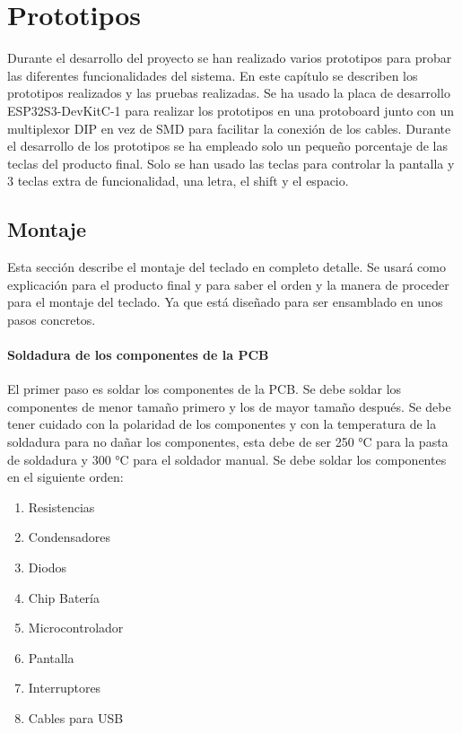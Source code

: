 \chapter{Prototipos}

Durante el desarrollo del proyecto se han realizado varios prototipos para probar las diferentes funcionalidades del sistema. En este capítulo se describen los prototipos realizados y las pruebas realizadas. Se ha usado la placa de desarrollo ESP32S3-DevKitC-1 para realizar los prototipos en una protoboard junto con un multiplexor DIP en vez de SMD para facilitar la conexión de los cables. Durante el desarrollo de los prototipos se ha empleado solo un pequeño porcentaje de las teclas del producto final. Solo se han usado las teclas para controlar la pantalla y 3 teclas extra de funcionalidad, una letra, el shift y el espacio.

\section{Montaje}
Esta sección describe el montaje del teclado en completo detalle. Se usará como explicación para el producto final y para saber el orden y la manera de proceder para el montaje del teclado. Ya que está diseñado para ser ensamblado en unos pasos concretos.

\subsubsection{Soldadura de los componentes de la PCB}
El primer paso es soldar los componentes de la PCB. Se debe soldar los componentes de menor tamaño primero y los de mayor tamaño después. Se debe tener cuidado con la polaridad de los componentes y con la temperatura de la soldadura para no dañar los componentes, esta debe de ser 250 °C para la pasta de soldadura y 300 °C para el soldador manual. Se debe soldar los componentes en el siguiente orden:
\newpage
\begin{enumerate}
    \item Resistencias
    \item Condensadores
    \item Diodos
    \item Chip Batería
    \item Microcontrolador
    \item Pantalla
    \item Interruptores
    \item Cables para \gls{USB}
\end{enumerate}

